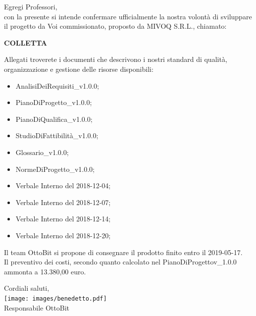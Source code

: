 \documentclass[11pt,a4paper]{article}
\begin{document}
\begin{minipage}{0.95\textwidth}
Egregi Professori,\\
con la presente si intende confermare ufficialmente la nostra volontà di sviluppare il progetto da Voi commissionato, proposto da  MIVOQ S.R.L., chiamato:
\begin{center}
\textbf{COLLETTA}
\end{center}

Allegati troverete i documenti che descrivono i nostri standard di qualità, organizzazione e gestione delle risorse disponibili:

\begin{itemize}
	\item AnalisiDeiRequisiti\_v1.0.0;
	\item PianoDiProgetto\_v1.0.0;
	\item PianoDiQualifica\_v1.0.0;
	\item StudioDiFattibilità\_v1.0.0;
	\item Glossario\_v1.0.0;
	\item NormeDiProgetto\_v1.0.0;
	\item Verbale Interno del 2018-12-04;
	\item Verbale Interno del 2018-12-07;
	\item Verbale Interno del 2018-12-14;
	\item Verbale Interno del 2018-12-20;
\end{itemize}

Il team OttoBit si propone di consegnare il prodotto finito entro il 2019-05-17.\\
Il preventivo dei costi, secondo quanto calcolato nel PianoDiProgettov\_1.0.0 ammonta a 13.380,00 euro.

\end{minipage}

	\hfill
	\begin{minipage}{0.3\textwidth}\raggedleft
	\vspace{4em}
	Cordiali saluti,\\
	\vspace{1em}
	\texttt{[image: images/benedetto.pdf]}
	\\Responsabile OttoBit
	
\end{minipage}
\end{document}

